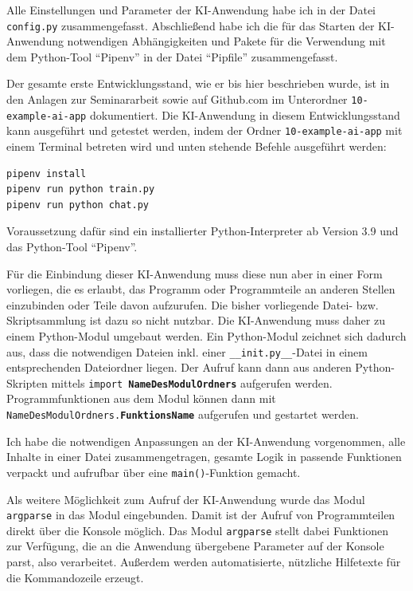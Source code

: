 \documentclass[12pt,oneside,titlepage,listof=totoc,bibliography=totoc]{scrartcl}
\newcommand{\code}[1]{\colorbox{code-gray}{\texttt{#1}}}
\begin{document}
Alle Einstellungen und Parameter der KI-Anwendung habe ich in der Datei \code{config.py} zusammengefasst. Abschließend habe ich die für das Starten der KI-Anwendung notwendigen Abhängigkeiten und Pakete für die Verwendung mit dem Python-Tool \enquote{Pipenv} in der Datei \enquote{Pipfile} zusammengefasst. 

Der gesamte erste Entwicklungsstand, wie er bis hier beschrieben wurde, ist in den Anlagen zur Seminararbeit sowie auf Github.com im Unterordner \code{10-example-ai-app} dokumentiert. Die KI-Anwendung in diesem Entwicklungsstand kann ausgeführt und getestet werden, indem der Ordner  \code{10-example-ai-app} mit einem Terminal betreten wird und unten stehende Befehle ausgeführt werden:


\begin{lstlisting}[language=bash]
pipenv install
pipenv run python train.py
pipenv run python chat.py
\end{lstlisting}

Voraussetzung dafür sind ein installierter Python-Interpreter ab Version 3.9 und das Python-Tool \enquote{Pipenv}.



Für die Einbindung dieser KI-Anwendung muss diese nun aber in einer Form vorliegen, die es erlaubt, das Programm oder Programmteile an anderen Stellen einzubinden oder Teile davon aufzurufen. Die bisher vorliegende Datei- bzw. Skriptsammlung ist dazu so nicht nutzbar. Die KI-Anwendung muss daher zu einem Python-Modul umgebaut werden. Ein Python-Modul zeichnet sich dadurch aus, dass die notwendigen Dateien inkl. einer \code{__init.py__}-Datei in einem entsprechenden Dateiordner liegen. Der Aufruf kann dann aus anderen Python-Skripten mittels \code{import \textbf{NameDesModulOrdners}} aufgerufen werden. Programmfunktionen aus dem Modul können dann mit \code{NameDesModulOrdners.\textbf{FunktionsName}} aufgerufen und gestartet werden.

Ich habe die notwendigen Anpassungen an der KI-Anwendung vorgenommen, alle Inhalte in einer Datei  zusammengetragen, gesamte Logik in passende Funktionen verpackt und aufrufbar über eine \code{main()}-Funktion gemacht. 

Als weitere Möglichkeit zum Aufruf der KI-Anwendung wurde das Modul \code{argparse} in das Modul eingebunden. Damit ist der Aufruf von Programmteilen direkt über die Konsole möglich. Das Modul \code{argparse} stellt dabei Funktionen zur Verfügung, die an die Anwendung übergebene Parameter auf der Konsole parst, also verarbeitet. Außerdem werden automatisierte, nützliche Hilfetexte für die Kommandozeile erzeugt.
\end{document}
